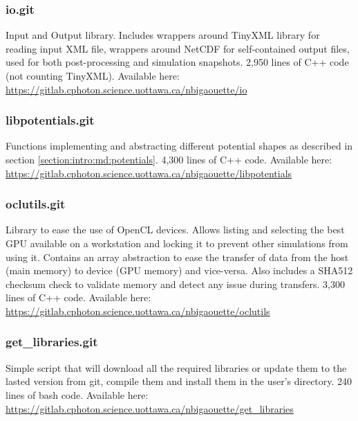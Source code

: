 \subsubsection{io.git} \label{section:tools:libraries:io}

Input and Output library. Includes wrappers around TinyXML library\cite{tinyxml}
for reading input XML file, wrappers around NetCDF\cite{netcdf} for self-contained
output files, used for both post-processing and simulation snapshots.
2,950 lines of C++ code (not counting TinyXML). Available here:
\url{https://gitlab.cphoton.science.uottawa.ca/nbigaouette/io}


\subsubsection{libpotentials.git} \label{section:tools:libraries:libpotentials}

Functions implementing and abstracting different potential shapes as
described in section \ref{section:intro:md:potentials}. 4,300 lines of C++ code.
Available here:
\url{https://gitlab.cphoton.science.uottawa.ca/nbigaouette/libpotentials}


\subsubsection{oclutils.git} \label{section:tools:libraries:oclutils}

Library to ease the use of OpenCL devices. Allows listing and selecting the
best GPU available on a workstation and locking it to prevent
other simulations from using it. Contains an array abstraction to ease the
transfer of data from the host (main memory) to device (GPU memory) and
vice-versa. Also includes a SHA512 checksum check to validate memory
and detect any issue during transfers. 3,300 lines of C++ code.
Available here:
\url{https://gitlab.cphoton.science.uottawa.ca/nbigaouette/oclutils}


\subsubsection{get\_libraries.git} \label{section:tools:libraries:getlibraries}

Simple script that will download all the required libraries or
update them to the lasted version from git, compile them and install them in the
user's directory. 240 lines of bash code.
Available here:
\url{https://gitlab.cphoton.science.uottawa.ca/nbigaouette/get_libraries}



